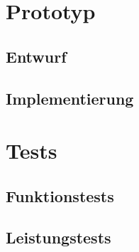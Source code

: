 \section{Prototyp}

\subsection{Entwurf}



\subsection{Implementierung}

\section{Tests}

\subsection{Funktionstests}

\subsection{Leistungstests}

